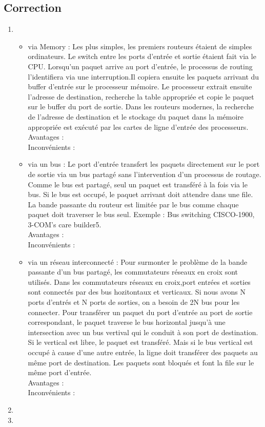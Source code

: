 \documentclass[a4paper, 11pt, titlepage]{article}
\begin{document}
\subsection{Correction}
\begin{enumerate}[label=(\alph*)]
\item
\begin{itemize}
\item via Memory : Les plus simples, les premiers routeurs étaient de simples ordinateurs. Le switch entre les ports d'entrée et sortie étaient fait via le CPU. Lorsqu'un paquet arrive au port d'entrée, le processus de routing l'identifiera via une interruption.Il copiera ensuite les paquets arrivant du buffer d'entrée sur le processeur mémoire. Le processeur extrait ensuite l'adresse de destination, recherche la table appropriée et copie le paquet sur le buffer du port de sortie. Dans les routeurs modernes, la recherche de l'adresse de destination et le stockage du paquet dans la mémoire appropriée est exécuté par les cartes de ligne d'entrée des processeurs.\\
Avantages : \\
Inconvénients : \\
\item via un bus : Le port d'entrée transfert les paquets directement sur le port de sortie via un bus partagé sans l'intervention d'un processus de routage. Comme le bus est partagé, seul un paquet est transféré à la fois via le bus. Si le bus est occupé, le paquet arrivant doit attendre dans une file. La bande passante du routeur est limitée par le bus comme chaque paquet doit traverser le bus seul. Exemple :  Bus switching CISCO-1900, 3-COM’s care builder5.\\
Avantages : \\
Inconvénients : \\
\item via un réseau interconnecté : Pour surmonter le problème de la bande passante d'un bus partagé, les commutateurs réseaux en croix sont utilisés. Dans les commutateurs réseaux en croix,port  entrées et sorties sont connectés par des bus hozitontaux et verticaux. Si nous avons N ports d'entrés et N ports de sorties, on a besoin de 2N bus pour les connecter. Pour transférer un paquet du port d'entrée au port de sortie correspondant, le paquet traverse le bus horizontal jusqu'à une intersection avec un bus vertival qui le conduit à son port de destination. Si le vertical est libre, le paquet est transféré. Mais si le bus vertical est occupé à cause d'une autre entrée, la ligne doit transférer des paquets au même port de destination. Les paquets sont bloqués et font la file sur le même port d'entrée.\\
Avantages : \\
Inconvénients : \\
\end{itemize}

\item 

\item 

\end{enumerate}
\end{document}
